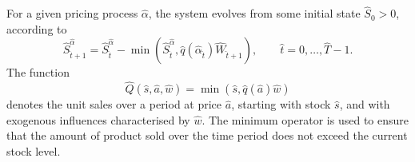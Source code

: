 \documentclass[main.tex]{subfiles}
\begin{document}
For a given pricing process $\hat{\alpha}$, the
system evolves from some initial state $\hat{S}_0>0$, according to
\begin{equation}\label{eq:stock_dynamics}
  \hat{S}_{\hat{t}+1}^{\hat{\alpha}}=\hat{S}_{\hat{t}}^{\hat{\alpha}}-\min(\hat{S}_{\hat{t}}^{\hat{\alpha}},\hat{q}(\hat{\alpha}_{\hat{t}})\hat{W}_{\hat{t}+1}),\qquad
  \hat{t}=0,\dots,\hat{T}-1.
\end{equation}
The function
\begin{equation}
  \hat{Q}(\hat{s},\hat{a},\hat{w})=\min(\hat{s},\hat{q}(\hat{a})\hat{w})
\end{equation}
denotes the unit sales over a
period at price $\hat{a}$,
starting with stock $\hat{s}$, and with exogenous influences
characterised by $\hat{w}$. The minimum operator is used to ensure that the
amount of product sold over the time period does not exceed the
current stock level.
\end{document}
